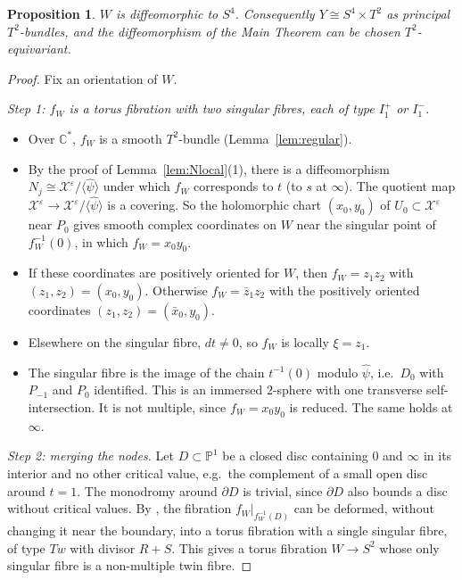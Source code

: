 \documentclass{article}
\newtheorem{proposition}[theorem]{Proposition}
\theoremstyle{definition}
\theoremstyle{plain}
\newcommand{\C}{\mathbb{C}}
\newcommand{\PP}{\mathbb{P}}
\newcommand{\cX}{\mathcal{X}}
\begin{document}
\begin{proposition}\label{prop:Wstandard}
$W$ is diffeomorphic to $S^4$. Consequently $Y\cong S^4\times T^2$ as principal
$T^2$-bundles, and the diffeomorphism of the Main Theorem can be chosen
$T^2$-equivariant.
\end{proposition}
\begin{proof}
Fix an orientation of $W$.

\emph{Step 1: $f_W$ is a torus fibration with two singular fibres, each of type
$I_1^+$ or $I_1^-$.}
\begin{itemize}
\item Over $\C^*$, $f_W$ is a smooth $T^2$-bundle (Lemma~\ref{lem:regular}).
\item By the proof of Lemma~\ref{lem:Nlocal}(1), there is a diffeomorphism
  $N_j\cong\cX^\varepsilon/\langle\hat\psi\rangle$ under which $f_W$ corresponds to $t$
  (to $s$ at $\infty$). The quotient map
  $\cX^\varepsilon\to\cX^\varepsilon/\langle\hat\psi\rangle$ is a covering. So the holomorphic
  chart $(x_0,y_0)$ of $U_0\subset\cX^\varepsilon$ near $P_0$ gives smooth complex
  coordinates on $W$ near the singular point of $f_W^{-1}(0)$, in which $f_W=x_0y_0$.
\item If these coordinates are positively oriented for $W$, then $f_W=z_1z_2$ with
  $(z_1,z_2)=(x_0,y_0)$. Otherwise $f_W=\bar z_1z_2$ with the positively oriented
  coordinates $(z_1,z_2)=(\bar x_0,y_0)$.
\item Elsewhere on the singular fibre, $dt\ne0$, so $f_W$ is locally $\xi=z_1$.
\item The singular fibre is the image of the chain $t^{-1}(0)$ modulo $\hat\psi$,
  i.e.\ $D_0$ with $P_{-1}$ and $P_0$ identified. This is an immersed $2$-sphere with
  one transverse self-intersection. It is not multiple, since $f_W=x_0y_0$ is reduced.
  The same holds at $\infty$.
\end{itemize}

\emph{Step 2: merging the nodes.} Let $D\subset\PP^1$ be a closed disc containing $0$
and $\infty$ in its interior and no other critical value, e.g.\ the complement of a
small open disc around $t=1$. The monodromy around $\partial D$ is trivial, since
$\partial D$ also bounds a disc without critical values. By
\cite[Thm.~4.1]{Matsumoto85}, the fibration $f_W|_{f_W^{-1}(D)}$ can be deformed,
without changing it near the boundary, into a torus fibration with a single singular
fibre, of type $Tw$ with divisor $R+S$. This gives a torus fibration $W\to S^2$ whose
only singular fibre is a non-multiple twin fibre.


\end{proof}
\end{document}
